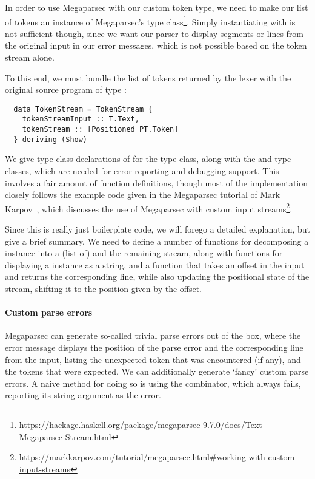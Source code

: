In order to use Megaparsec with our custom token type, we need to make our list
of tokens an instance of Megaparsec's  type class\footnote{\url{https://hackage.haskell.org/package/megaparsec-9.7.0/docs/Text-Megaparsec-Stream.html}}.
Simply instantiating  with  is not
sufficient though, since we want our parser to display segments or lines from
the original input in our error messages, which is not possible based on the
token stream alone.

To this end, we must bundle the list of tokens returned by the lexer with the
original source program of type :
%
\begin{verbatim}
  data TokenStream = TokenStream {
    tokenStreamInput :: T.Text,
    tokenStream :: [Positioned PT.Token]
  } deriving (Show)
\end{verbatim}
%
We give type class declarations of  for the 
type class, along with the  and 
type classes, which are needed for error reporting and debugging support.
This involves a fair amount of function definitions, though most of the
implementation closely follows the example code given in the Megaparsec tutorial
of Mark Karpov~\citep{Karpov2019}, which discusses the use of Megaparsec with custom input
streams\footnote{\url{https://markkarpov.com/tutorial/megaparsec.html\#working-with-custom-input-streams}}.

Since this is really just boilerplate code, we will forego a detailed
explanation, but give a brief summary.
We need to define a number of functions for decomposing a 
instance into a (list of)  and the remaining stream,
along with functions for displaying a  instance as a
string, and a function that takes an offset in the input and returns the
corresponding line, while also updating the positional state of the stream,
shifting it to the position given by the offset.


\paragraph{Custom parse errors}

Megaparsec can generate so-called trivial parse errors out of the box, where the
error message displays the position of the parse error and the corresponding
line from the input, listing the unexpected token that was encountered (if any),
and the tokens that were expected.
We can additionally generate `fancy' custom parse errors. A naive method for
doing so is using the  combinator, which always fails, reporting
its string argument as the error.

